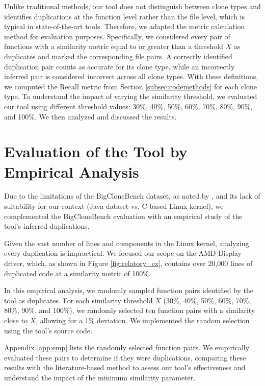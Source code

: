 Unlike traditional methods, our tool does not distinguish between clone types and identifies duplications at the function level rather than the file level, which is typical in state-of-the-art tools. Therefore, we adapted the metric calculation method for evaluation purposes. Specifically, we considered every pair of functions with a similarity metric equal to or greater than a threshold \(X\) as duplicates and marked the corresponding file pairs. A correctly identified duplication pair counts as accurate for its clone type, while an incorrectly inferred pair is considered incorrect across all clone types. With these definitions, we computed the Recall metric from Section \ref{subsec:codemethods} for each clone type.
%
To understand the impact of varying the similarity threshold, we evaluated our tool using different threshold values: 30\%, 40\%, 50\%, 60\%, 70\%, 80\%, 90\%, and 100\%. We then analyzed and discussed the results.

\section{Evaluation of the Tool by Empirical Analysis}

\label{sec:metemp}

Due to the limitations of the BigCloneBench dataset, as noted by \cite{bigfail}, and its lack of suitability 
for our context (Java dataset vs. C-based Linux kernel), we complemented the BigCloneBench evaluation with 
an empirical study of the tool's inferred duplications.

Given the vast number of lines and components in the Linux kernel, analyzing every duplication is impractical. We focused our scope on the AMD Display driver, which, as shown in Figure \ref{fig:relatory_ex}, contains over 20,000 lines of duplicated code at a similarity metric of 100\%.

In this empirical analysis, we randomly sampled function pairs identified by the tool as duplicates. For each similarity threshold \(X\) (30\%, 40\%, 50\%, 60\%, 70\%, 80\%, 90\%, and 100\%), we randomly selected ten function pairs with a similarity close to \(X\), allowing for a 1\% deviation. We implemented the random selection using the tool's source code.

Appendix \ref{app:emp} lists the randomly selected function pairs. We empirically evaluated these pairs to determine if they were duplications, comparing these results with the literature-based method to assess our tool's effectiveness and understand the impact of the minimum similarity parameter.

